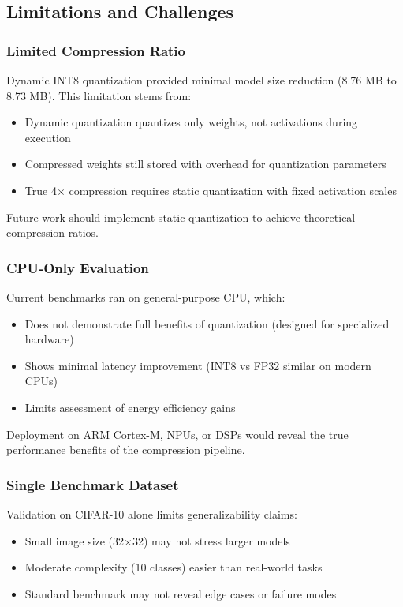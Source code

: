 \subsection{Limitations and Challenges}

\subsubsection{Limited Compression Ratio}
Dynamic INT8 quantization provided minimal model size reduction (8.76 MB to 8.73 MB). This limitation stems from:
\begin{itemize}
\item Dynamic quantization quantizes only weights, not activations during execution
\item Compressed weights still stored with overhead for quantization parameters
\item True 4$\times$ compression requires static quantization with fixed activation scales
\end{itemize}

Future work should implement static quantization to achieve theoretical compression ratios.

\subsubsection{CPU-Only Evaluation}
Current benchmarks ran on general-purpose CPU, which:
\begin{itemize}
\item Does not demonstrate full benefits of quantization (designed for specialized hardware)
\item Shows minimal latency improvement (INT8 vs FP32 similar on modern CPUs)
\item Limits assessment of energy efficiency gains
\end{itemize}

Deployment on ARM Cortex-M, NPUs, or DSPs would reveal the true performance benefits of the compression pipeline.

\subsubsection{Single Benchmark Dataset}
Validation on CIFAR-10 alone limits generalizability claims:
\begin{itemize}
\item Small image size (32$\times$32) may not stress larger models
\item Moderate complexity (10 classes) easier than real-world tasks
\item Standard benchmark may not reveal edge cases or failure modes
\end{itemize}

